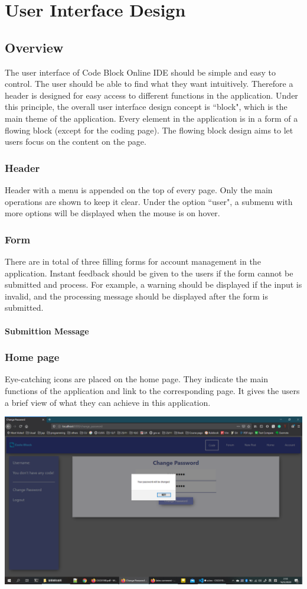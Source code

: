 \chapter{User Interface Design}
\section{Overview}
The user interface of Code Block Online IDE should be simple and easy to control. The user should be able to find what they want intuitively. Therefore a header is designed for easy access to different functions in the application. Under this principle, the overall user interface design concept is ``block", which is the main theme of the application. Every element in the application is in a form of a flowing block (except for the coding page). The flowing block design aims to let users focus on the content on the page.

\subsection{Header}
Header with a menu is appended on the top of every page. Only the main operations are shown to keep it clear. Under the option ``user", a submenu with more options will be displayed when the mouse is on hover.

\subsection{Form}
There are in total of three filling forms for account management in the application. Instant feedback should be given to the users if the form cannot be submitted and process. For example, a warning should be displayed if the input is invalid, and the processing message should be displayed after the form is submitted.
\subsubsection{Submittion Message}

\subsection{Home page}
Eye-catching icons are placed on the home page. They indicate the main functions of the application and link to the corresponding page. It gives the users a brief view of what they can achieve in this application.

\includegraphics[scale=0.4]{Doc/Pics/change_pw_sign.png}

